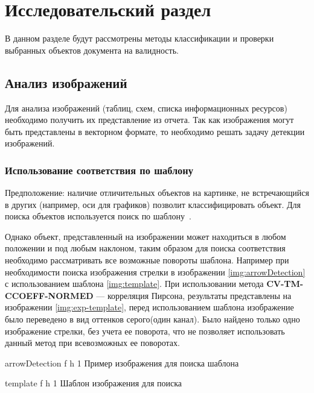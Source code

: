\chapter{Исследовательский раздел}
В данном разделе будут рассмотрены методы классификации и проверки выбранных объектов документа на валидность.

\section{Анализ изображений}
Для анализа изображений (таблиц, схем, списка информационных ресурсов) необходимо получить их представление из отчета. Так как изображения могут быть представлены
в векторном формате, то необходимо решать задачу детекции изображений. 	



\subsection{Использование соответствия по шаблону}
Предположение: наличие отличительных объектов на картинке, не встречающийся в других (например, оси для графиков) позволит классифицировать объект.
Для поиска объектов используется поиск по шаблону~\cite{pattern_matching}.

Однако объект, представленный на изображении может находиться в любом положении и под любым наклоном, таким образом для поиска соответствия необходимо 
рассматривать все возможные повороты шаблона. Например при необходимости поиска изображения стрелки  в изображении \ref{img:arrowDetection} с использованием шаблона \ref{img:template}. При использовании метода \textbf{CV-TM-CCOEFF-NORMED} — корреляция Пирсона, результаты представлены на изображении \ref{img:exp-template}, перед использованием шаблона изображение было переведено в  вид оттенков серого(один канал).
Было найдено только одно изображение стрелки, без учета ее поворота, что не позволяет использовать данный метод при всевозможных ее поворотах.

{arrowDetection} %
{f} %
{h} %
{1\textwidth} %
{Пример изображения для поиска шаблона} %


{template} %
{f} %
{h} %
{1\textwidth} %
{Шаблон изображения для поиска} %



